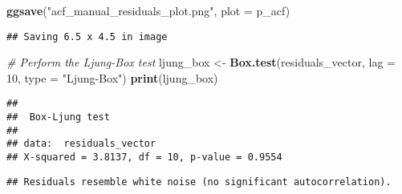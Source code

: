 \documentclass[
]{article}
\newenvironment{Shaded}{\begin{snugshade}}{\end{snugshade}}
\newcommand{\AttributeTok}[1]{\textcolor[rgb]{0.13,0.29,0.53}{#1}}
\newcommand{\CommentTok}[1]{\textcolor[rgb]{0.56,0.35,0.01}{\textit{#1}}}
\newcommand{\ControlFlowTok}[1]{\textcolor[rgb]{0.13,0.29,0.53}{\textbf{#1}}}
\newcommand{\DecValTok}[1]{\textcolor[rgb]{0.00,0.00,0.81}{#1}}
\newcommand{\FloatTok}[1]{\textcolor[rgb]{0.00,0.00,0.81}{#1}}
\newcommand{\FunctionTok}[1]{\textcolor[rgb]{0.13,0.29,0.53}{\textbf{#1}}}
\newcommand{\NormalTok}[1]{#1}
\newcommand{\OtherTok}[1]{\textcolor[rgb]{0.56,0.35,0.01}{#1}}
\newcommand{\SpecialCharTok}[1]{\textcolor[rgb]{0.81,0.36,0.00}{\textbf{#1}}}
\newcommand{\StringTok}[1]{\textcolor[rgb]{0.31,0.60,0.02}{#1}}
\begin{document}
\begin{Shaded}
\begin{Highlighting}[]
\FunctionTok{ggsave}\NormalTok{(}\StringTok{"acf\_manual\_residuals\_plot.png"}\NormalTok{, }\AttributeTok{plot =}\NormalTok{ p\_acf)}
\end{Highlighting}
\end{Shaded}

\begin{verbatim}
## Saving 6.5 x 4.5 in image
\end{verbatim}

\begin{Shaded}
\begin{Highlighting}[]
\CommentTok{\# Perform the Ljung{-}Box test}
\NormalTok{ljung\_box }\OtherTok{\textless{}{-}} \FunctionTok{Box.test}\NormalTok{(residuals\_vector, }\AttributeTok{lag =} \DecValTok{10}\NormalTok{, }\AttributeTok{type =} \StringTok{"Ljung{-}Box"}\NormalTok{)}
\FunctionTok{print}\NormalTok{(ljung\_box)}
\end{Highlighting}
\end{Shaded}

\begin{verbatim}
## 
##  Box-Ljung test
## 
## data:  residuals_vector
## X-squared = 3.8137, df = 10, p-value = 0.9554
\end{verbatim}

\begin{Shaded}
\end{Shaded}

\begin{verbatim}
## Residuals resemble white noise (no significant autocorrelation).
\end{verbatim}
\end{document}
